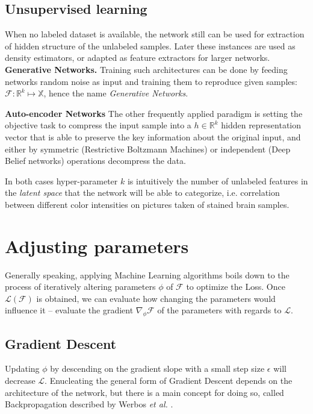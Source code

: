 \subsection{Unsupervised learning}
When no labeled dataset is available, the network still can be used for extraction of hidden structure of the unlabeled samples. Later these instances are used as density estimators, or adapted as feature extractors for larger networks.
\textbf{Generative Networks.} Training such architectures can be done by feeding networks random noise as input and training them to reproduce given samples: $\mathcal{F}:\mathbb{R}^k \mapsto \mathbb{X}$, hence the name \emph{Generative Networks}.

\textbf{Auto-encoder Networks} The other frequently applied paradigm is setting the objective task to compress the input sample into a $h \in \mathbb{R}^k$ hidden representation vector that is able to preserve the key information about the original input, and either by symmetric (Restrictive Boltzmann Machines) or independent (Deep Belief networks) operations decompress the data.

In both cases hyper-parameter $k$ is intuitively the number of unlabeled features in the \emph{latent space} that the network will be able to categorize, i.e. correlation between different color intensities on pictures taken of stained brain samples.


\section{Adjusting parameters}
Generally speaking, applying Machine Learning algorithms boils down to the process of iteratively altering parameters $\phi$ of $\mathcal{F}$ to optimize the Loss.
Once $\mathcal{L}(\mathcal{F})$ is obtained, we can evaluate how changing the parameters would influence it -- evaluate the gradient $\nabla_\phi \mathcal{F}$ of the parameters  with regards to $\mathcal{L}$.

\subsection{Gradient Descent}
Updating $\phi$ by descending on the gradient slope with a small step size $\epsilon$ will decrease $\mathcal{L}$.
Enucleating the general form of Gradient Descent depends on the architecture of the network, but there is a main concept for doing so, called Backpropagation described by Werbos \emph{et al.} \cite{werbos1994roots}.

